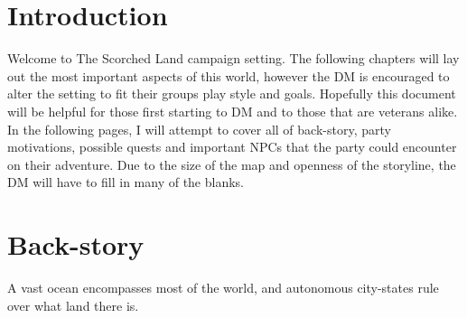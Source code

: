\section{Introduction}

Welcome to The Scorched Land campaign setting.  The following chapters will lay 
out the most important aspects of this world, however the DM is encouraged to 
alter the setting to fit their groups play style and goals.  Hopefully this document
will be helpful for those first starting to DM and to those that are veterans
alike.  In the following pages, I will attempt to cover all of back-story, party
motivations, possible quests and important NPCs that the party could encounter on 
their adventure.  Due to the size of the map and openness of the storyline, the 
DM will have to fill in many of the blanks.

\section{Back-story}

A vast ocean encompasses most of the world, and autonomous city-states rule over
what land there is.  
